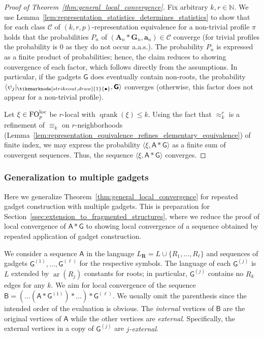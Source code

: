 \documentclass[11pt]{article}
\theoremstyle{plain}
\theoremstyle{definition}
\theoremstyle{remark}
\DeclareMathOperator\qranksym{qrank}
\newcommand{\qrank}[1]{{\qranksym({#1})}}
\DeclareMathOperator\aritysym{ar}
\newcommand{\arity}[1]{{\aritysym({#1})}}
\newcommand{\N}{\mathbb{N}}
\DeclareMathOperator\FO{FO}
\newcommand{\FOloc}[1]{\FO_{#1}^\textnormal{loc}}
\newcommand{\stonepar}[2]{\langle #1, #2 \rangle}
\newcommand{\str}[1]{\mathbf{#1}}
\newcommand{\strseq}[1]{{\boldsymbol{\mathsf{#1}}}}
\newcommand{\tpl}[1]{{\bm{#1}}}
\newcommand{\nonroot}{\tikzmarknode[strike out,draw]{1}{\bullet}}
\begin{document}
\begin{proof}[Proof of Theorem~\ref{thm:general_local_convergence}]
    Fix arbitrary $k, r \in \N$.
    We use Lemma~\ref{lem:representation_statistics_determines_statistics} to show that for each class $\mathcal{C}$ of $(k,r,p)$-representation equivalence for a non-trivial profile $\pi$ holds that the probabilities $P_n$ of $(\str{A}_n * \str{G}_n, \tpl{a}_n) \in \mathcal{C}$ converge (for trivial profiles the probability is $0$ as they do not occur a.a.s.).
    The probability $P_n$ is expressed as a finite product of probabilities; hence, the claim reduces to showing convergence of each factor, which follows directly from the assumptions.
    In particular, if the gadgets $\strseq{G}$ does eventually contain non-roots, the probability $\stonepar{\psi_j|_{\nonroot}}{\strseq{G}}$ converges (otherwise, this factor does not appear for a non-trivial profile).
    
    Let $\xi \in \FOloc{p}$ be $r$-local with $\qrank{\xi} \leq k$.
    Using the fact that $\approx_k^r$ is a refinement of $\equiv_k$ on $r$-neighborhoods (Lemma~\ref{lem:representation_equivalence_refines_elementary_equivalence}) of finite index, we may express the probability $\stonepar{\xi}{\strseq{A}*\strseq{G}}$ as a finite sum of convergent sequences.
    Thus, the sequence $\stonepar{\xi}{\strseq{A}*\strseq{G}}$ converges.
\end{proof}

\subsubsection{Generalization to multiple gadgets}\label{sssec:multiple_gadgets}

Here we generalize Theorem~\ref{thm:general_local_convergence} for repeated gadget construction with multiple gadgets.
This is preparation for Section~\ref{ssec:extension_to_fragmented_structures}, where we reduce the proof of local convergence of $\strseq{A}*\strseq{G}$ to showing local convergence of a sequence obtained by repeated application of gadget construction.

We consider a sequence $\strseq{A}$ in the language $L_\tpl{R} = L \cup \{R_1, \dots, R_\ell\}$ and sequences of gadgets $\strseq{G}^{(1)}, \dots, \strseq{G}^{(\ell)}$ for the respective symbols.
The language of each $\strseq{G}^{(j)}$ is $L$ extended by $\arity{R_j}$ constants for roots; in particular, $\strseq{G}^{(j)}$ contains no $R_k$ edges for any $k$.
We aim for local convergence of the sequence $\strseq{B} = (\dots(\strseq{A}*\strseq{G}^{(1)}) * \dots ) *\strseq{G}^{(\ell)}$.
We usually omit the parenthesis since the intended order of the evaluation is obvious.
The \emph{internal} vertices of $\strseq{B}$ are the original vertices of $\strseq{A}$ while the other vertices are \emph{external}.
Specifically, the external vertices in a copy of $\strseq{G}^{(j)}$ are \emph{$j$-external}.
\end{document}
